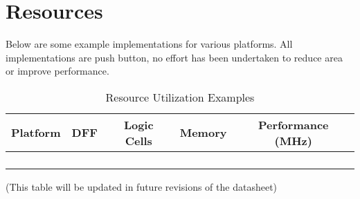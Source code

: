 \chapter{Resources} \label{resources}

Below are some example implementations for various platforms. All implementations are push button, no effort has been undertaken to reduce area or improve performance.

\setlength\LTleft{0pt}
\setlength\LTright{0pt}

\begin{longtable}[]{@{\extracolsep{\fill}}lcccc@{}}
\toprule
Platform & DFF & Logic Cells & Memory & Performance (MHz)\tabularnewline
\midrule
\endhead
& & & &\tabularnewline
& & & &\tabularnewline
& & & &\tabularnewline
\bottomrule
\caption{Resource Utilization Examples}
\end{longtable}

(This table will be updated in future revisions of the datasheet)

